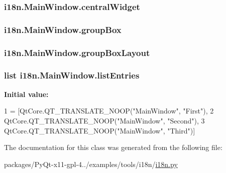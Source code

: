 \subsubsection[{central\+Widget}]{\setlength{\rightskip}{0pt plus 5cm}i18n.\+Main\+Window.\+central\+Widget}\label{classi18n_1_1MainWindow_abdfbfc4cd874db3bdfeb4363a4a75692}
\hypertarget{classi18n_1_1MainWindow_ae800ef7cd871621074e3b75570408ced}{}
\subsubsection[{group\+Box}]{\setlength{\rightskip}{0pt plus 5cm}i18n.\+Main\+Window.\+group\+Box}\label{classi18n_1_1MainWindow_ae800ef7cd871621074e3b75570408ced}
\hypertarget{classi18n_1_1MainWindow_a3773830930a2f2064038bd7217eaa6be}{}
\subsubsection[{group\+Box\+Layout}]{\setlength{\rightskip}{0pt plus 5cm}i18n.\+Main\+Window.\+group\+Box\+Layout}\label{classi18n_1_1MainWindow_a3773830930a2f2064038bd7217eaa6be}
\hypertarget{classi18n_1_1MainWindow_aada35d8247c61549974e696109fb1545}{}
\subsubsection[{list\+Entries}]{\setlength{\rightskip}{0pt plus 5cm}list i18n.\+Main\+Window.\+list\+Entries\hspace{0.3cm}{\ttfamily [static]}}\label{classi18n_1_1MainWindow_aada35d8247c61549974e696109fb1545}
{\bfseries Initial value\+:}
\begin{DoxyCode}
1 = [QtCore.QT\_TRANSLATE\_NOOP(\textcolor{stringliteral}{"MainWindow"}, \textcolor{stringliteral}{"First"}),
2                    QtCore.QT\_TRANSLATE\_NOOP(\textcolor{stringliteral}{"MainWindow"}, \textcolor{stringliteral}{"Second"}),
3                    QtCore.QT\_TRANSLATE\_NOOP(\textcolor{stringliteral}{"MainWindow"}, \textcolor{stringliteral}{"Third"})]
\end{DoxyCode}


The documentation for this class was generated from the following file\+:\begin{DoxyCompactItemize}
\item 
packages/\+Py\+Qt-\/x11-\/gpl-\/4../examples/tools/i18n/\hyperlink{i18n_8py}{i18n.\+py}\end{DoxyCompactItemize}
